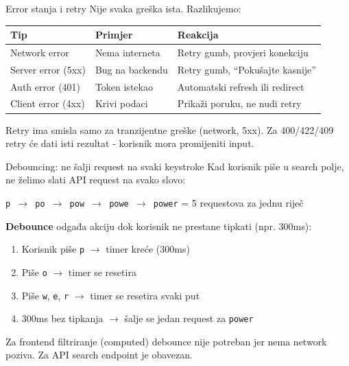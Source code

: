 \begin{frame}{Error stanja i retry}
Nije svaka greška ista. Razlikujemo:

\vspace{0.4em}
\begin{tabular}{@{}lp{4cm}p{5cm}@{}}
  \toprule
  \textbf{Tip} & \textbf{Primjer} & \textbf{Reakcija} \\
  \midrule
  Network error & Nema interneta & Retry gumb, provjeri konekciju \\
  Server error (5xx) & Bug na backendu & Retry gumb, \enquote{Pokušajte kasnije} \\
  Auth error (401) & Token istekao & Automatski refresh ili redirect \\
  Client error (4xx) & Krivi podaci & Prikaži poruku, ne nudi retry \\
  \bottomrule
\end{tabular}

\vspace{0.6em}
Retry ima smisla samo za tranzijentne greške (network, 5xx). Za 400/422/409 retry će dati isti rezultat - korisnik mora promijeniti input.
\end{frame}

\begin{frame}{Debouncing: ne šalji request na svaki keystroke}
Kad korisnik piše u search polje, ne želimo slati API request na svako slovo:

\vspace{0.4em}
\begin{center}
\texttt{p $\rightarrow$ po $\rightarrow$ pow $\rightarrow$ powe $\rightarrow$ power} = 5 requestova za jednu riječ
\end{center}

\vspace{0.6em}
\textbf{Debounce} odgađa akciju dok korisnik ne prestane tipkati (npr. 300ms):
\begin{enumerate}
  \item Korisnik piše \texttt{p} $\rightarrow$ timer kreće (300ms)
  \item Piše \texttt{o} $\rightarrow$ timer se resetira
  \item Piše \texttt{w}, \texttt{e}, \texttt{r} $\rightarrow$ timer se resetira svaki put
  \item 300ms bez tipkanja $\rightarrow$ šalje se jedan request za \texttt{power}
\end{enumerate}

\vspace{0.4em}
Za frontend filtriranje (computed) debounce nije potreban jer nema network poziva. Za API search endpoint je obavezan.
\end{frame}

